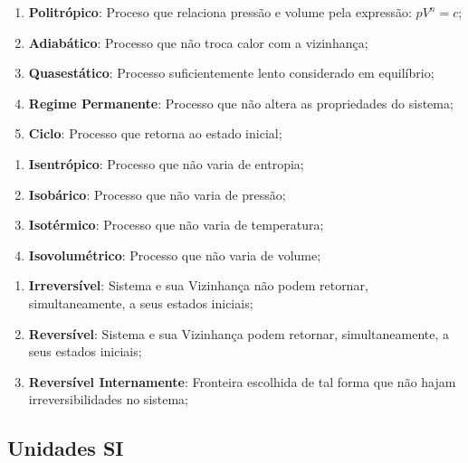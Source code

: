 \documentclass{article}
\begin{document}
                \begin{enumerate}[noitemsep]
                    \item \textbf{Politrópico}: Proceso que relaciona pressão e volume pela expressão: $pV^{n} = c$;
                    \item \textbf{Adiabático}: Processo que não troca calor com a vizinhança;
                    \item \textbf{Quasestático}: Processo suficientemente lento considerado em equilíbrio;
                    \item \textbf{Regime Permanente}: Processo que não altera as propriedades do sistema;
                    \item \textbf{Ciclo}: Processo que retorna ao estado inicial;
                \end{enumerate}
                
                \begin{enumerate}[noitemsep]
                    \item \textbf{Isentrópico}: Processo que não varia de entropia;
                    \item \textbf{Isobárico}: Processo que não varia de pressão;
                    \item \textbf{Isotérmico}: Processo que não varia de temperatura;
                    \item \textbf{Isovolumétrico}: Processo que não varia de volume;
                \end{enumerate}

                \begin{enumerate}[noitemsep]
                    \item \textbf{Irreversível}: Sistema e sua Vizinhança não podem retornar, simultaneamente, a seus estados iniciais;
                    \item \textbf{Reversível}: Sistema e sua Vizinhança podem retornar, simultaneamente, a seus estados iniciais;
                    \item \textbf{Reversível Internamente}: Fronteira escolhida de tal forma que não hajam irreversibilidades no sistema;
                \end{enumerate}
\newpage

        \subsection{Unidades SI}
\end{document}
